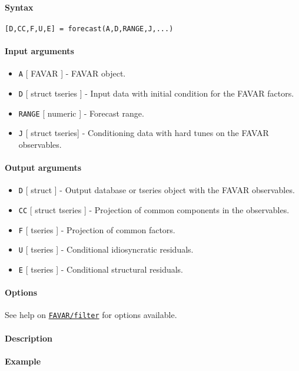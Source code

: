 


	\paragraph{Syntax}

\begin{verbatim}
[D,CC,F,U,E] = forecast(A,D,RANGE,J,...)
\end{verbatim}

\paragraph{Input arguments}

\begin{itemize}
\item
  \texttt{A} {[} FAVAR {]} - FAVAR object.
\item
  \texttt{D} {[} struct \textbar{} tseries {]} - Input data with initial
  condition for the FAVAR factors.
\item
  \texttt{RANGE} {[} numeric {]} - Forecast range.
\item
  \texttt{J} {[} struct \textbar{} tseries{]} - Conditioning data with
  hard tunes on the FAVAR observables.
\end{itemize}

\paragraph{Output arguments}

\begin{itemize}
\item
  \texttt{D} {[} struct {]} - Output database or tseries object with the
  FAVAR observables.
\item
  \texttt{CC} {[} struct \textbar{} tseries {]} - Projection of common
  components in the observables.
\item
  \texttt{F} {[} tseries {]} - Projection of common factors.
\item
  \texttt{U} {[} tseries {]} - Conditional idiosyncratic residuals.
\item
  \texttt{E} {[} tseries {]} - Conditional structural residuals.
\end{itemize}

\paragraph{Options}

See help on \href{FAVAR/filter}{\texttt{FAVAR/filter}} for options
available.

\paragraph{Description}

\paragraph{Example}


